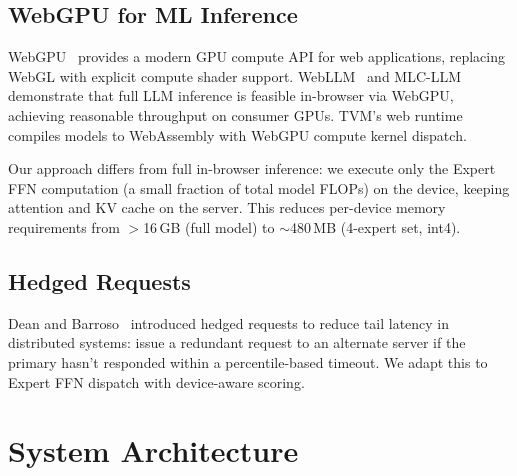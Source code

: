 \documentclass[11pt,a4paper]{article}
\begin{document}
\subsection{WebGPU for ML Inference}

WebGPU~\cite{webgpu2024} provides a modern GPU compute API for web
applications, replacing WebGL with explicit compute shader support.
WebLLM~\cite{webllm2024} and MLC-LLM~\cite{mlcllm2024} demonstrate
that full LLM inference is feasible in-browser via WebGPU, achieving
reasonable throughput on consumer GPUs. TVM's web
runtime~\cite{chen2018tvm} compiles models to WebAssembly with WebGPU
compute kernel dispatch.

Our approach differs from full in-browser inference: we execute only
the Expert FFN computation (a small fraction of total model FLOPs) on
the device, keeping attention and KV cache on the server. This reduces
per-device memory requirements from $>$16\,GB (full model) to
$\sim$480\,MB (4-expert set, int4).

\subsection{Hedged Requests}

Dean and Barroso~\cite{dean2013tail} introduced hedged requests to
reduce tail latency in distributed systems: issue a redundant request
to an alternate server if the primary hasn't responded within a
percentile-based timeout. We adapt this to Expert FFN dispatch with
device-aware scoring.

\section{System Architecture}
\label{sec:arch}
\end{document}
